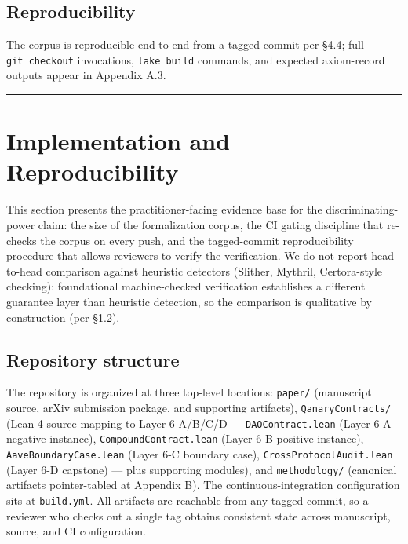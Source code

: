 \subsection{Reproducibility}\label{reproducibility}

The corpus is reproducible end-to-end from a tagged commit per §4.4;
full \texttt{git\ checkout} invocations, \texttt{lake\ build} commands,
and expected axiom-record outputs appear in Appendix A.3.

\begin{center}\rule{0.5\linewidth}{0.5pt}\end{center}

\section{Implementation and
Reproducibility}\label{implementation-and-reproducibility}

This section presents the practitioner-facing evidence base for the
discriminating-power claim: the size of the formalization corpus, the CI
gating discipline that re-checks the corpus on every push, and the
tagged-commit reproducibility procedure that allows reviewers to verify
the verification. We do not report head-to-head comparison against
heuristic detectors (Slither, Mythril, Certora-style checking):
foundational machine-checked verification establishes a different
guarantee layer than heuristic detection, so the comparison is
qualitative by construction (per §1.2).

\subsection{Repository structure}\label{repository-structure}

The repository is organized at three top-level locations:
\texttt{paper/} (manuscript source, arXiv submission package, and
supporting artifacts), \texttt{QanaryContracts/} (Lean 4 source mapping
to Layer 6-A/B/C/D --- \texttt{DAOContract.lean} (Layer 6-A negative
instance), \texttt{CompoundContract.lean} (Layer 6-B positive instance),
\texttt{AaveBoundaryCase.lean} (Layer 6-C boundary case),
\texttt{CrossProtocolAudit.lean} (Layer 6-D capstone) --- plus
supporting modules), and \texttt{methodology/} (canonical artifacts
pointer-tabled at Appendix B). The continuous-integration configuration
sits at \texttt{build.yml}. All artifacts are reachable from any tagged
commit, so a reviewer who checks out a single tag obtains consistent
state across manuscript, source, and CI configuration.

